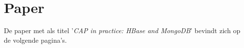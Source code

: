 \chapter{Paper}
De paper met als titel '\textit{CAP in practice: HBase and MongoDB}' bevindt zich op de volgende pagina's. 
